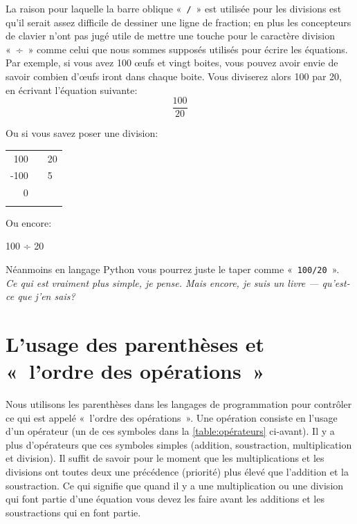 La raison pour laquelle la barre oblique «~\texttt{/}~» est utilisée pour les divisions est qu'il serait assez difficile de dessiner une ligne de fraction; en plus les concepteurs de clavier n'ont pas jugé utile de mettre une touche pour le caractère division «~÷~» comme celui que nous sommes supposés utilisés pour écrire les équations. Par exemple, si vous avez 100 œufs et vingt boites, vous pouvez avoir envie de savoir combien d'œufs iront dans chaque boite. Vous diviserez alors 100 par 20, en écrivant l'équation suivante:
\begin{displaymath}
\frac{100}{20}
\end{displaymath}

Ou si vous savez poser une division:

\begin{center}
\begin{tabular}{rr|l}
100& &20\\
\cline{3-3}
-100& &5\\
\cline{1-1}
0& &\\
 & & 
\end{tabular}
\end{center}

Ou encore:
\begin{center}
100 ÷ 20
\end{center}

Néanmoins en langage Python vous pourrez juste le taper comme «~\texttt{100/20}~».\\


\emph{Ce qui est vraiment plus simple, je pense. Mais encore, je suis un livre --- qu'est-ce que j'en sais?} 

\section{L'usage des parenthèses et «~l'ordre des opérations~»}

Nous utilisons les parenthèses dans les langages de programmation pour contrôler ce qui est appelé «~l'ordre des opérations~». Une opération consiste en l'usage d'un opérateur (un de ces symboles dans la  \autoref{table:opérateurs} ci-avant). Il y a plus d'opérateurs que ces symboles simples (addition, soustraction, multiplication et division). Il suffit de savoir pour le moment que les multiplications et les divisions ont toutes deux une précédence (priorité) plus élevé que l'addition et la soustraction. Ce qui signifie que quand il y a une multiplication ou une division qui font partie d'une équation vous devez les faire avant les additions et les soustractions qui en font partie.

